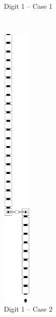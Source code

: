 \begin{itemize}
\begin{figure}[H]
\begin{subfigure}[t]{0.24\textwidth}
                \caption{\label{fig:pre_warp_case1_digit1_msr} Digit 1 -- Case 1}
            \end{subfigure}%
            ~
            \begin{subfigure}[t]{0.24\textwidth}
                \centering
                \includegraphics[width=0.15\textwidth]{warping_pre_warp_case2_digit1_msr}
                \caption{\label{fig:pre_warp_case2_digit1_msr} Digit 1 -- Case 2}
            \end{subfigure}%
            ~
            \begin{subfigure}[t]{0.24\textwidth}
                \centering

\end{subfigure}
\end{figure}
\end{itemize}
